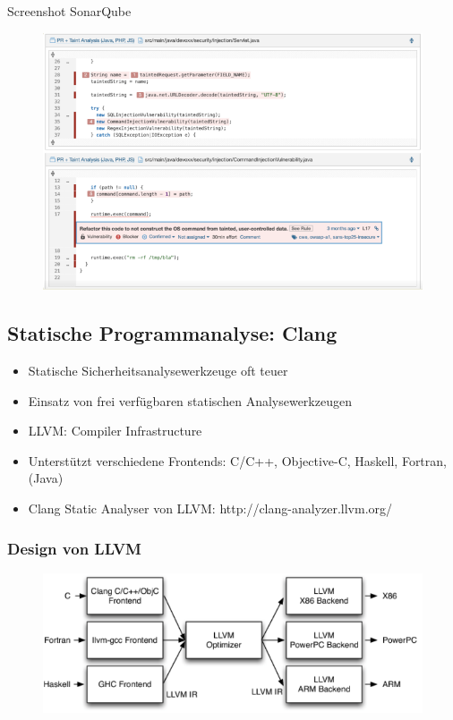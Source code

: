 \documentclass[openany]{book}
\begin{document}
\newpage

Screenshot SonarQube

\begin{figure}[h!]
    \centering
    \includegraphics[width=0.85\linewidth]{Pics/SonarQube.PNG}
\end{figure}

\subsection{Statische Programmanalyse: Clang}

\begin{itemize}
    \item Statische Sicherheitsanalysewerkzeuge oft teuer
    \item Einsatz von frei verfügbaren statischen Analysewerkzeugen
    \item LLVM: Compiler Infrastructure
    \item Unterstützt verschiedene Frontends: C/C++, Objective-C, Haskell, Fortran, (Java)
    \item Clang Static Analyser von LLVM: http://clang-analyzer.llvm.org/
\end{itemize}

\newpage

\subsubsection{Design von LLVM}

\begin{figure}[h!]
    \centering
    \includegraphics[width=\linewidth]{Pics/LLVM.PNG}
\end{figure}
\end{document}
